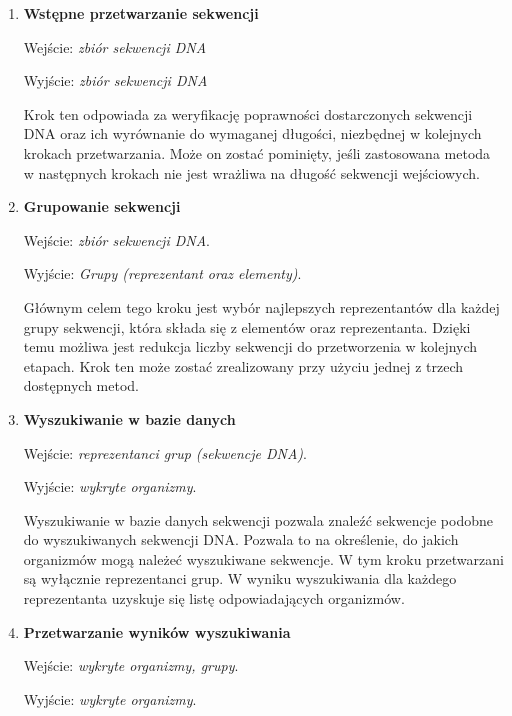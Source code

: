             \begin{enumerate}
                \item {
                    \textbf{Wstępne przetwarzanie sekwencji}

                    Wejście: \textit{zbiór sekwencji DNA}

                    Wyjście: \textit{zbiór sekwencji DNA}

                    Krok ten odpowiada za weryfikację poprawności dostarczonych sekwencji DNA oraz ich wyrównanie do wymaganej długości, niezbędnej w kolejnych krokach przetwarzania. Może on zostać pominięty, jeśli zastosowana metoda w następnych krokach nie jest wrażliwa na długość sekwencji wejściowych.
                }
                \item {
                    \textbf{Grupowanie sekwencji}

                    Wejście: \textit{zbiór sekwencji DNA}.

                    Wyjście: \textit{Grupy (reprezentant oraz elementy)}.

                    Głównym celem tego kroku jest wybór najlepszych reprezentantów dla każdej grupy sekwencji, która składa się z elementów oraz reprezentanta. Dzięki temu możliwa jest redukcja liczby sekwencji do przetworzenia w kolejnych etapach. Krok ten może zostać zrealizowany przy użyciu jednej z trzech dostępnych metod.
                }
                \item {
                    \textbf{Wyszukiwanie w bazie danych}

                    Wejście: \textit{reprezentanci grup (sekwencje DNA)}.

                    Wyjście: \textit{wykryte organizmy}.

                    Wyszukiwanie w bazie danych sekwencji pozwala znaleźć sekwencje podobne do wyszukiwanych sekwencji DNA. Pozwala to na określenie, do jakich organizmów mogą należeć wyszukiwane sekwencje. W tym kroku przetwarzani są wyłącznie reprezentanci grup. W wyniku wyszukiwania dla każdego reprezentanta uzyskuje się listę odpowiadających organizmów.
                }
                \item {
                    \textbf{Przetwarzanie wyników wyszukiwania}

                    Wejście: \textit{wykryte organizmy, grupy}.

                    Wyjście: \textit{wykryte organizmy}.

}
\end{enumerate}
